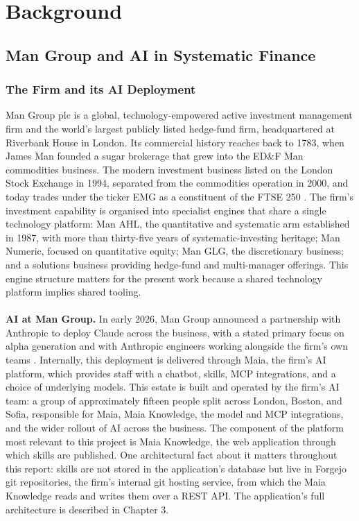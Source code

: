 \chapter{Background}
\label{ch:background}

\section{Man Group and AI in Systematic Finance}
\subsection{The Firm and its AI Deployment}
Man Group plc is a global, technology-empowered active investment management firm and the world's largest publicly listed hedge-fund firm, headquartered at Riverbank House in London. Its commercial history reaches back to 1783, when James Man founded a sugar brokerage that grew into the ED\&F Man commodities business. The modern investment business listed on the London Stock Exchange in 1994, separated from the commodities operation in 2000, and today trades under the ticker EMG as a constituent of the FTSE 250 \cite{mangroup2026about}. The firm's investment capability is organised into specialist engines that share a single technology platform: Man AHL, the quantitative and systematic arm established in 1987, with more than thirty-five years of systematic-investing heritage; Man Numeric, focused on quantitative equity; Man GLG, the discretionary business; and a solutions business providing hedge-fund and multi-manager offerings. This engine structure matters for the present work because a shared technology platform implies shared tooling.
\\\\
\textbf{AI at Man Group.} In early 2026, Man Group announced a partnership with Anthropic to deploy Claude across the business, with a stated primary focus on alpha generation and with Anthropic engineers working alongside the firm's own teams \cite{mangroup2026anthropic}. Internally, this deployment is delivered through Maia, the firm's AI platform, which provides staff with a chatbot, skills, MCP integrations, and a choice of underlying models. This estate is built and operated by the firm's AI team: a group of approximately fifteen people split across London, Boston, and Sofia, responsible for Maia, Maia Knowledge, the model and MCP integrations, and the wider rollout of AI across the business. The component of the platform most relevant to this project is Maia Knowledge, the web application through which skills are published. One architectural fact about it matters throughout this report: skills are not stored in the application's database but live in Forgejo git repositories, the firm's internal git hosting service, from which the Maia Knowledge reads and writes them over a REST API. The application's full architecture is described in Chapter 3.
